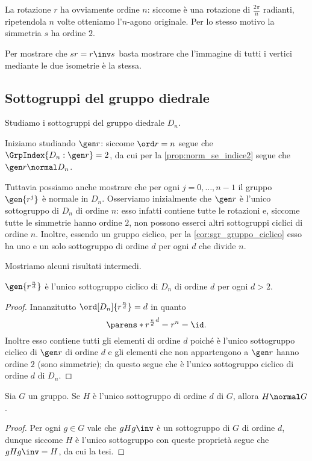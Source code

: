 La rotazione $r$ ha ovviamente ordine $n$: siccome è una rotazione di $\frac{2\pi}{n}$ radianti, ripetendola $n$ volte otteniamo l'$n$-agono originale.
Per lo stesso motivo la simmetria $s$ ha ordine $2$.

Per mostrare che $sr = r\inv s$ basta mostrare che l'immagine di tutti i vertici mediante le due isometrie è la stessa. 

\subsection{Sottogruppi del gruppo diedrale}

Studiamo i sottogruppi del gruppo diedrale $D_n$.

Iniziamo studiando $\gen r$: siccome $\ord r = n$ segue che $\GrpIndex{D_n : \gen r} = 2$, da cui per la \autoref{prop:norm_se_indice2} segue che $\gen r \normal D_n$.

Tuttavia possiamo anche mostrare che per ogni $j = 0, \dots, n-1$ il gruppo $\gen{r^j}$ è normale in $D_n$. Osserviamo inizialmente che $\gen r$ è l'unico sottogruppo di $D_n$ di ordine $n$: esso infatti contiene tutte le rotazioni e, siccome tutte le simmetrie hanno ordine $2$, non possono esserci altri sottogruppi ciclici di ordine $n$.
Inoltre, essendo un gruppo ciclico, per la \autoref{cor:sgr_gruppo_ciclico} esso ha uno e un solo sottogruppo di ordine $d$ per ogni $d$ che divide $n$.

Mostriamo alcuni risultati intermedi.
\begin{proposition}
    $\gen{r^{\frac{n}{d}}}$ è l'unico sottogruppo ciclico di $D_n$ di ordine $d$ per ogni $d > 2$.
\end{proposition}
\begin{proof}
    Innanzitutto $\ord[D_n]{r^{\frac{n}{d}}} = d$ in quanto \[
        \parens*{r^{\frac{n}{d}}}^d = r^n = \id.
    \] Inoltre esso contiene tutti gli elementi di ordine $d$ poiché è l'unico sottogruppo ciclico di $\gen r$ di ordine $d$ e gli elementi che non appartengono a $\gen r$ hanno ordine $2$ (sono simmetrie); da questo segue che è l'unico sottogruppo ciclico di ordine $d$ di $D_n$.
\end{proof}

\begin{proposition}
    Sia $G$ un gruppo. Se $H$ è l'unico sottogruppo di ordine $d$ di $G$, allora $H \normal G$.
\end{proposition}
\begin{proof}
    Per ogni $g \in G$ vale che $gHg\inv$ è un sottogruppo di $G$ di ordine $d$, dunque siccome $H$ è l'unico sottogruppo con queste proprietà segue che $gHg\inv = H$, da cui la tesi.
\end{proof}

